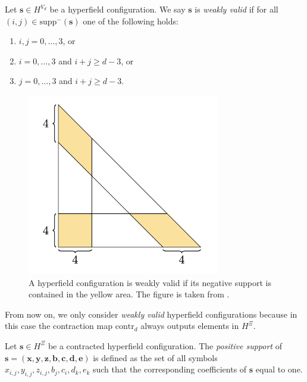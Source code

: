 \begin{definition}
    Let \( \mathbf{s} \in H^{V_d} \) be a hyperfield configuration. We say \( \mathbf{s} \) is \emph{weakly valid} if for all \( (i,j) \in \mathrm{supp}^-(\mathbf{s}) \) one of the following holds:
    \begin{enumerate}
        \item \( i,j = 0, \dots, 3 \), or
        \item \( i = 0, \dots, 3 \) and \( i+j \geq d-3 \), or
        \item \( j = 0, \dots, 3 \) and \( i + j \geq d-3 \).
    \end{enumerate}
\end{definition}

\begin{figure}[H]
    \centering
    \includegraphics[width=0.75\textwidth]{assets/weakly-valid.png}
    \caption{A hyperfield configuration is weakly valid if its negative support is contained in the yellow area. The figure is taken from \cite{bik2022classifying}.}
\end{figure}

From now on, we only consider \emph{weakly valid} hyperfield configurations because in this case the contraction map \( \mathrm{contr}_d \) always outputs elements in \( H^{\Xi} \).

\begin{definition}
    Let \( \mathbf{s} \in H^{\Xi} \) be a contracted hyperfield configuration. The \emph{positive support} of \( \mathbf{s} = (\mathbf{x}, \mathbf{y}, \mathbf{z}, \mathbf{b}, \mathbf{c}, \mathbf{d}, \mathbf{e}) \) is defined as the set of all symbols \( x_{i,j}, y_{i,j}, z_{i,j}, b_j, c_i, d_k, e_k \) such that the corresponding coefficients of \( \mathbf{s} \) equal to one.
\end{definition}

